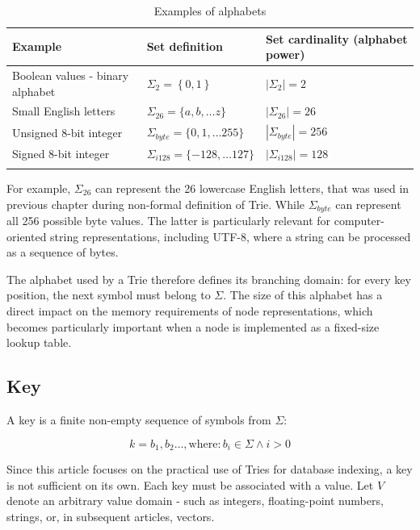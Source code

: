 \documentclass[pdflatex,sn-mathphys-num]{sn-jnl}%
\theoremstyle{thmstyleone}%
\theoremstyle{thmstyletwo}%
\theoremstyle{thmstylethree}%
\begin{document}
\begin{table}[h]
\caption{Examples of alphabets}\label{tab:alphabetExamples}%
\begin{tabular}{@{}l|ll@{}}
\toprule
Example & Set definition & Set cardinality (alphabet power) \\
\midrule
Boolean values - binary alphabet &
$\Sigma_{2} = \left\{ 0,1\right\}$ &
$\left| \Sigma_{2} \right| = 2$ \\
Small English letters &
\(\Sigma_{26} = \{ a,b,\dots z\}\) &
\(\left| \Sigma_{26} \right| = 26\) \\
Unsigned 8-bit integer  &
\(\Sigma_{byte} = \{ 0,1,\dots255\}\) &
\(\left| \Sigma_{byte} \right| = 256\) \\
Signed 8-bit integer &
\(\Sigma_{i128} = \{ - 128,\dots127\}\)&
\(\left| \Sigma_{i128} \right| = 128\) \\
\botrule
\end{tabular}
\footnotetext{
}
\end{table}

\noindent

For example, \(\Sigma_{26}\) can represent the 26 lowercase English letters, that was used in previous chapter
during non-formal definition of Trie. While \(\Sigma_{byte}\) can represent
all 256 possible byte values. The latter is particularly relevant for computer-oriented string representations,
including UTF-8, where a string can be processed as a sequence of bytes.

The alphabet used by a Trie therefore defines its branching domain: for every key position, the next symbol must belong
to \(\Sigma\). The size of this alphabet has a direct impact on the memory requirements of node representations, which
becomes particularly important when a node is implemented as a fixed-size lookup table.

\subsection{Key}\label{key}

A key is a finite non-empty sequence of symbols from $\Sigma$:

\begin{equation}
k = b_{1},b_{2} \ldots,
 \mathrm{where}\!:
  b_{i} \in \Sigma  \land  i > 0
\end{equation}

Since this article focuses on the practical use of Tries for database
indexing, a key is not sufficient on its own. Each key must be
associated with a value. Let $V$ denote an arbitrary value domain - such
as integers, floating-point numbers, strings, or, in subsequent
articles, vectors.
\end{document}
